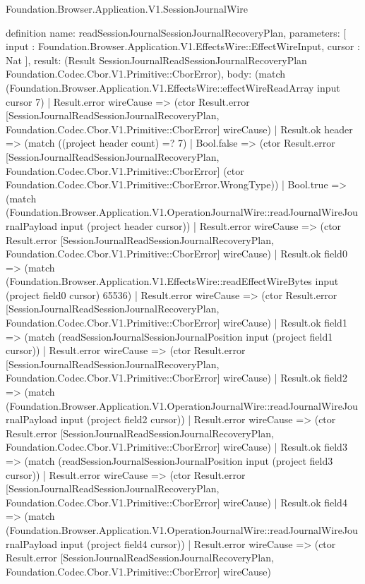 \begin{lexlean}{Foundation.Browser.Application.V1.SessionJournalWire}
\begin{semanticmodule}
definition{
  name: readSessionJournalSessionJournalRecoveryPlan,
  parameters: [
    input : Foundation.Browser.Application.V1.EffectsWire::EffectWireInput,
    cursor : Nat
  ],
  result: (Result SessionJournalReadSessionJournalRecoveryPlan Foundation.Codec.Cbor.V1.Primitive::CborError),
  body: (match (Foundation.Browser.Application.V1.EffectsWire::effectWireReadArray input cursor 7)
    | Result.error wireCause => (ctor Result.error [SessionJournalReadSessionJournalRecoveryPlan, Foundation.Codec.Cbor.V1.Primitive::CborError] wireCause)
    | Result.ok header => (match ((project header count) =? 7)
      | Bool.false => (ctor Result.error [SessionJournalReadSessionJournalRecoveryPlan, Foundation.Codec.Cbor.V1.Primitive::CborError] (ctor Foundation.Codec.Cbor.V1.Primitive::CborError.WrongType))
      | Bool.true => (match (Foundation.Browser.Application.V1.OperationJournalWire::readJournalWireJournalPayload input (project header cursor))
        | Result.error wireCause => (ctor Result.error [SessionJournalReadSessionJournalRecoveryPlan, Foundation.Codec.Cbor.V1.Primitive::CborError] wireCause)
        | Result.ok field0 => (match (Foundation.Browser.Application.V1.EffectsWire::readEffectWireBytes input (project field0 cursor) 65536)
          | Result.error wireCause => (ctor Result.error [SessionJournalReadSessionJournalRecoveryPlan, Foundation.Codec.Cbor.V1.Primitive::CborError] wireCause)
          | Result.ok field1 => (match (readSessionJournalSessionJournalPosition input (project field1 cursor))
            | Result.error wireCause => (ctor Result.error [SessionJournalReadSessionJournalRecoveryPlan, Foundation.Codec.Cbor.V1.Primitive::CborError] wireCause)
            | Result.ok field2 => (match (Foundation.Browser.Application.V1.OperationJournalWire::readJournalWireJournalPayload input (project field2 cursor))
              | Result.error wireCause => (ctor Result.error [SessionJournalReadSessionJournalRecoveryPlan, Foundation.Codec.Cbor.V1.Primitive::CborError] wireCause)
              | Result.ok field3 => (match (readSessionJournalSessionJournalPosition input (project field3 cursor))
                | Result.error wireCause => (ctor Result.error [SessionJournalReadSessionJournalRecoveryPlan, Foundation.Codec.Cbor.V1.Primitive::CborError] wireCause)
                | Result.ok field4 => (match (Foundation.Browser.Application.V1.OperationJournalWire::readJournalWireJournalPayload input (project field4 cursor))
                  | Result.error wireCause => (ctor Result.error [SessionJournalReadSessionJournalRecoveryPlan, Foundation.Codec.Cbor.V1.Primitive::CborError] wireCause)
}
\end{semanticmodule}
\end{lexlean}
